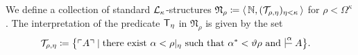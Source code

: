 \documentclass[UKenglish,cleveref,DIV=12]{scrartcl}
\newtheorem{lemma}[theorem]{Lemma}%
\theoremstyle{definition}
\theoremstyle{definition}
\newcommand{\gelhighlight}[1]{\highlight[magenta]{#1}}
\begin{document}

We define a collection of standard $\mathcal{L}_\kappa$-structures $\mathfrak N_\rho \coloneq \langle\, \mathbb N , ( \mathcal{T}_{\rho,\eta} )_{\eta < \kappa }\,\rangle $ for $\rho<\Omega^\kappa$.
The interpretation of the predicate \( \mathsf{T}_\eta \) in \( \mathfrak N_\rho \) is given by the set
\begin{align*}
	\FF_{\rho,\eta} \coloneq \bigl\{ \gn A &\mid \text{there exist $\alpha < \rho|_\eta$ such that $\alpha^* < \vartheta\rho$ and $\prov{\alpha}A$} \bigr\}.
\end{align*}
\end{document}
